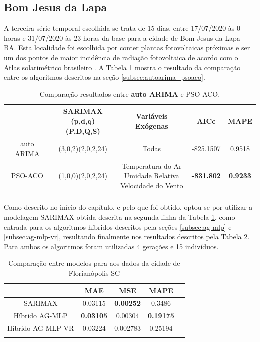 \subsection{Bom Jesus da Lapa}

A terceira série temporal escolhida se trata de 15 dias, entre 17/07/2020 às 0 horas e 31/07/2020 às 23 horas da base para a cidade de Bom Jesus da Lapa - BA. Esta localidade foi escolhida por conter plantas fotovoltaicas próximas e ser um dos pontos de maior incidência de radiação fotovoltaica de acordo com o Atlas solarimétrico brasileiro \cite{pereira2017atlas}. A Tabela \ref{tab:cap4_comp_bjl_autoarima_psoaco} mostra o resultado da comparação entre os algoritmos descritos na seção \ref{subsec:autoarima_psoaco}.

\begin{table}[htbp]
\caption{Comparação resultados entre \textbf{auto ARIMA} e PSO-ACO.}
\begin{center}
\begin{tabular}{ccccc}
                    & \Longstack{SARIMAX \\ (p,d,q)(P,D,Q,S)} & Variáveis Exógenas & AICc & MAPE  \\\hline
auto ARIMA & (3,0,2)(2,0,2,24) & Todas & -825.1507 & 0.9518 \\\hline
PSO-ACO             & (1,0,0)(2,0,2,24) & \Longstack{Temperatura do Ar \\ Umidade Relativa \\ Velocidade do Vento} & \textbf{-831.802} & \textbf{0.9233} \\\hline
\label{tab:cap4_comp_bjl_autoarima_psoaco}
\end{tabular}
\end{center}
\end{table}

Como descrito no início do capítulo, e pelo que foi obtido, optou-se por utilizar a modelagem SARIMAX obtida descrita na segunda linha da Tabela \ref{tab:cap4_comp_bjl_autoarima_psoaco}, como entrada para os algoritmos híbridos descritos pela seções \ref{subsec:ag-mlp} e \ref{subsec:ag-mlp-vr}, resultando finalmente nos resultados descritos pela Tabela \ref{tab:cap4_comp_bjl_agmlp_agmlpvr}. Para ambos os algoritmos foram utilizadas 4 gerações e 15 indivíduos.

\begin{table}[htbp]
\caption{Comparação entre modelos para aos dados da cidade de Florianópolis-SC}
\begin{center}
\begin{tabular}{ccccc}
                & MAE & MSE & MAPE \\\hline
SARIMAX         & 0.03115 & \textbf{0.00252} & 0.3486 \\\hline
Híbrido AG-MLP  & \textbf{0.03105} & 0.00304 & \textbf{0.19175} \\\hline
Híbrido AG-MLP-VR & 0.03224 & 0.002783 & 0.25194 \\\hline
\label{tab:cap4_comp_bjl_agmlp_agmlpvr}
\end{tabular}
\end{center}
\end{table}

